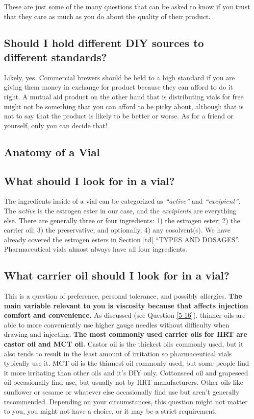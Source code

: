 \documentclass{article}
\begin{document}
These are just some of the many questions that can be asked to know if you trust that they care as much as you do about the quality of their product.

\subsection{Should I hold different DIY sources to different standards?}

Likely, yes. Commercial brewers should be held to a high standard if you are giving them money in exchange for product because they can afford to do it right. A mutual aid product on the other hand that is distributing vials for free might not be something that you can afford to be picky about, although that is not to say that the product is likely to be better or worse. As for a friend or yourself, only you can decide that!

\subsection*{Anatomy of a Vial}

\subsection{What should I look for in a vial?}

The ingredients inside of a vial can be categorized as \textit{“active”} and \textit{“excipient”}. The \textit{active} is the estrogen ester in our case, and the \textit{excipients} are everything else. There are generally three or four ingredients: 1) the estrogen ester; 2) the carrier oil; 3) the preservative; and optionally, 4) any cosolvent(s). We have already covered the estrogen esters in Section \ref{td} “TYPES AND DOSAGES”. Pharmaceutical vials almost always have all four ingredients.

\subsection{What carrier oil should I look for in a vial?}\label{6-16}

This is a question of preference, personal tolerance, and possibly allergies. \textbf{The main variable relevant to you is viscosity because that affects injection comfort and convenience.} As discussed (see Question \ref{5-16}), thinner oils are able to more conveniently use higher gauge needles without difficulty when drawing and injecting. \textbf{The most commonly used carrier oils for HRT are castor oil and MCT oil.} Castor oil is the thickest oils commonly used, but it also tends to result in the least amount of irritation so pharmaceutical vials typically use it. MCT oil is the thinnest oil commonly used, but some people find it more irritating than other oils and it’s DIY only. Cottonseed oil and grapeseed oil occasionally find use, but usually not by HRT manufacturers. Other oils like sunflower or sesame or whatever else occasionally find use but aren’t generally recommended. Depending on your circumstances, this question might not matter to you, you might not have a choice, or it may be a strict requirement.
\end{document}
